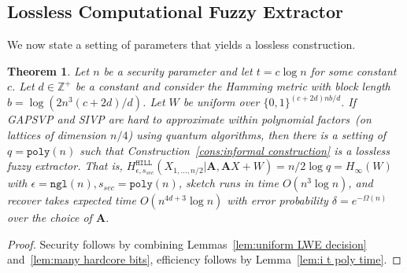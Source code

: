 \documentclass[11pt]{article}
\newcommand{\lemref}[1]{\mbox{Lemma~\ref{#1}}}
\newcommand{\consref}[1]{\mbox{Construction~\ref{#1}}}
\newcommand{\class}[1]{{\ensuremath{\mathsf{#1}}}}
\newcommand{\zo}{\ensuremath{\{0, 1\}}}
\newcommand{\vect}[1]{\ensuremath{\textbf{#1}}}
\newcommand{\hill}{\ensuremath{\mathtt{HILL}}\xspace}
\newcommand{\poly}{\ensuremath{\mathtt{poly}}\xspace}
\newcommand{\ngl}{\ensuremath{\mathtt{ngl}}\xspace}
\newcommand{\LWE}{\class{LWE}}
\newtheorem{theorem}{Theorem}[section]
\newcommand{\vA}{\vect{A}}
\begin{document}

\subsection{Lossless Computational Fuzzy Extractor}
\label{sec:lossless extractor}
We now state a setting of parameters that yields a lossless construction.  


\begin{theorem}
\label{thm:lossless secure conductor log}
Let $n$ be a security parameter and let $t = c\log n$ for some constant $c$.  Let $d\in \mathbb{Z}^+$ be a constant and consider the Hamming metric with block length $b = \log (2n^3 (c+2d)/d)$.  Let $W$ be uniform over $\zo^{(c+2d)nb/d}$.  If GAPSVP and SIVP are hard to approximate within polynomial factors~(on lattices of dimension $n/4$) using quantum algorithms, then there is a setting of $q = \poly(n)$ such that \consref{cons:informal construction} is a lossless fuzzy extractor.  That is, $H^{\hill}_{\epsilon, s_{sec}}(X_{1,..., n/2}|\vA, \vA X+W) = n/2\log q = H_\infty(W)$
with 
$\epsilon = \ngl(n), s_{sec} = \poly(n)$,  sketch runs in time $O(n^3\log n)$, and recover takes expected time $O(n^{4d+3} \log n)$ with error probability $\delta = e^{-\Omega(n)}$ over the choice of $\vA$.
\end{theorem}
\begin{proof}
Security follows by combining Lemmas~\ref{lem:uniform LWE decision} and~\ref{lem:many hardcore bits}, efficiency follows by \lemref{lem:i t poly time}.
\end{proof}
\end{document}
